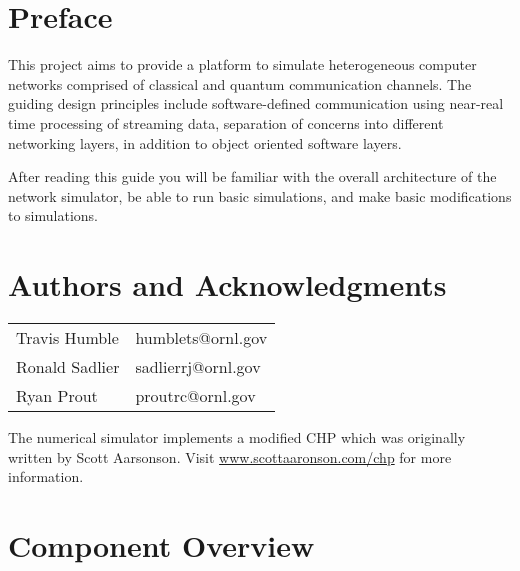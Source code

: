 \documentclass[letterpaper,twoside=false]{scrbook}
\begin{document}
\title{\documentTitle}
\date{\documentVersion}
\maketitle
\tableofcontents

\chapter{Preface}

This project aims to provide a platform to simulate heterogeneous computer networks comprised of classical and quantum communication channels. The guiding design principles include software-defined communication using near-real time processing of streaming data, separation of concerns into different networking layers, in addition to object oriented software layers.

After reading this guide you will be familiar with the overall architecture of the network simulator, be able to run basic simulations, and make basic modifications to simulations.

\chapter{Authors and Acknowledgments}

\begin{tabular}{ l l }
	Travis Humble & humblets@ornl.gov \\
	Ronald Sadlier & sadlierrj@ornl.gov \\
	Ryan Prout & proutrc@ornl.gov
\end{tabular}


The numerical simulator implements a modified CHP which was originally written  by Scott Aarsonson. Visit \url{www.scottaaronson.com/chp} for more information.

\chapter{Component Overview}
\end{document}
